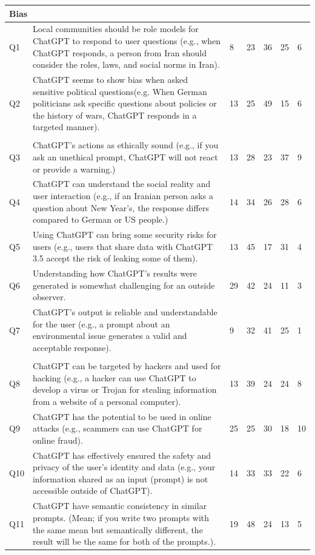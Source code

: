 \documentclass[sigconf]{acmart}
\begin{document}
\begin{longtable}{p{0.6cm}p{9cm}p{1.2cm}p{1cm}p{1cm}p{1cm}p{1cm}}
\multicolumn{7}{l}{\textbf{Bias}} \\
\hline
Q1 & Local communities should be role models for ChatGPT to respond to user questions (e.g., when ChatGPT responds, a person from Iran should consider the roles, laws, and social norms in Iran). & 8 & 23 & 36 & 25 & 6 \\
Q2 & ChatGPT seems to show bias when asked sensitive political questions(e.g. When German politicians ask specific questions about policies or the history of wars, ChatGPT responds in a targeted manner). & 13 & 25 & 49 & 15 & 6 \\
\addlinespace[0.5em]
\hline
\multicolumn{7}{l}{\textbf{Trustworthiness}} \\
\hline
Q3 & ChatGPT's actions as ethically sound (e.g., if you ask an unethical prompt, ChatGPT will not react or provide a warning.) & 13 & 28 & 23 & 37 & 9 \\
Q4 & ChatGPT can understand the social reality and user interaction (e.g., if an Iranian person asks a question about New Year's, the response differs compared to German or US people.) & 14 & 34 & 26 & 28 & 6 \\
Q5 & Using ChatGPT can bring some security risks for users (e.g., users that share data with ChatGPT 3.5 accept the risk of leaking some of them). & 13 & 45 & 17 & 31 & 4 \\
Q6 & Understanding how ChatGPT's results were generated is somewhat challenging for an outside observer. & 29 & 42 & 24 & 11 & 3 \\
Q7 & ChatGPT's output is reliable and understandable for the user (e.g., a prompt about an environmental issue generates a valid and acceptable response). & 9 & 32 & 41 & 25 & 1 \\
\addlinespace[0.5em]
\hline
\multicolumn{7}{l}{\textbf{Security}} \\
\hline
Q8 & ChatGPT can be targeted by hackers and used for hacking (e.g., a hacker can use ChatGPT to develop a virus or Trojan for stealing information from a website of a personal computer). & 13 & 39 & 24 & 24 & 8 \\
Q9 & ChatGPT has the potential to be used in online attacks (e.g., scammers can use ChatGPT for online fraud). & 25 & 25 & 30 & 18 & 10 \\
Q10 & ChatGPT has effectively ensured the safety and privacy of the user's identity and data (e.g., your information shared as an input (prompt) is not accessible outside of ChatGPT). & 14 & 33 & 33 & 22 & 6 \\
Q11 & ChatGPT have semantic consistency in similar prompts. (Mean; if you write two prompts with the same mean but semantically different, the result will be the same for both of the prompts.). & 19 & 48 & 24 & 13 & 5 \\


\end{longtable}
\end{document}
